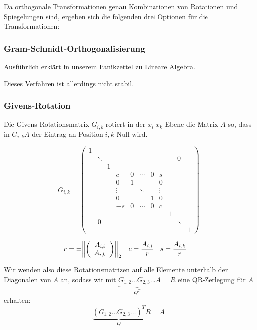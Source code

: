 \documentclass[a4paper,parskip=half*,DIV=7,fontsize=11pt]{scrartcl}
\DeclarePairedDelimiter\norm{\lVert}{\rVert}
\begin{document}
Da orthogonale Transformationen genau Kombinationen von Rotationen und Spiegelungen sind, ergeben sich die folgenden drei Optionen für die Transformationen:

\subsubsection{Gram-Schmidt-Orthogonalisierung}

Ausführlich erklärt in unserem \href{http://panikzettel.philworld.de/la.pdf#page=18}{Panikzettel zu Lineare Algebra}.

Dieses Verfahren ist allerdings nicht stabil.

\subsubsection{Givens-Rotation}

Die Givens-Rotationsmatrix $G_{i,k}$ rotiert in der $x_i$-$x_k$-Ebene die Matrix $A$ so, dass in $G_{i,k} A$ der Eintrag an Position $i, k$ Null wird.

\[
  G_{i,k} = \left(\begin{array}{ccccccccccc}
    1 \\
    &	\ddots	&	&	&	&	&	&	&	&	0	\\
    &	&	1	\\
    &	&	&	c	&	0	&	\cdots	&	0	&	s	\\
    &	&	&	0	&	1	&	&	&	0	\\
    &	&	&	\vdots	&	&	\ddots	&	&	\vdots	\\
    &	&	&	0	&	&	&	1	&	0	\\
    &	&	&	-s	&	0	&	\cdots	&	0	&	c	\\
    &	&	&	&	&	&	&	&	1	\\
    &	0	&	&	&	&	&	&	&	&	\ddots	\\
    &	&	&	&	&	&	&	&	&	&	1
  \end{array}\right)
\]

\begin{align*}
   r &= \pm\norm*{\left(\begin{array}{c}
   A_{i,i}	\\	A_{i,k}
   \end{array}\right)}_2	&
   c &= \frac{A_{i,i}}{r}	&
   s &= \frac{A_{i,k}}{r}
\end{align*}

Wir wenden also diese Rotationsmatrizen auf alle Elemente unterhalb der Diagonalen von $A$ an, sodass wir mit $\underbrace{G_{1,2} \ldots G_{2,3} \ldots}_{Q^T} A = R$ eine QR-Zerlegung für $A$ erhalten:
\[ \underbrace{\left(G_{1,2} \ldots G_{2,3} \ldots\right)^T}_Q R = A \]
\end{document}
